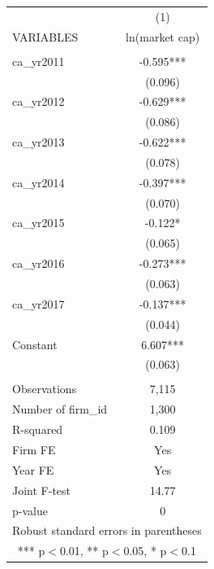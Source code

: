 \begin{tabular}{lc} \hline
 & (1) \\
VARIABLES & ln(market cap) \\ \hline
 &  \\
ca\_yr2011 & -0.595*** \\
 & (0.096) \\
ca\_yr2012 & -0.629*** \\
 & (0.086) \\
ca\_yr2013 & -0.622*** \\
 & (0.078) \\
ca\_yr2014 & -0.397*** \\
 & (0.070) \\
ca\_yr2015 & -0.122* \\
 & (0.065) \\
ca\_yr2016 & -0.273*** \\
 & (0.063) \\
ca\_yr2017 & -0.137*** \\
 & (0.044) \\
Constant & 6.607*** \\
 & (0.063) \\
 &  \\
Observations & 7,115 \\
Number of firm\_id & 1,300 \\
R-squared & 0.109 \\
Firm FE & Yes \\
Year FE & Yes \\
Joint F-test & 14.77 \\
 p-value & 0 \\ \hline
\multicolumn{2}{c}{ Robust standard errors in parentheses} \\
\multicolumn{2}{c}{ *** p$<$0.01, ** p$<$0.05, * p$<$0.1} \\
\end{tabular}
